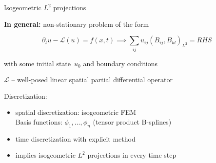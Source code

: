 \documentclass[c]{beamer}
\newcommand{\Prod}[2]{(#1, #2)_{L^2}}
\begin{document}
\begin{frame}{Isogeometric $L^2$ projections}


\textbf{In general:} non-stationary problem of the form

\begin{equation*}
  \partial_t u - \mathcal{L}(u) = f(x, t) \implies  \sum_{ij} u_{ij} \Prod{B_{ij}}{B_{kl}} = RHS
\end{equation*}

with some initial state~$u_0$ and boundary conditions
\vspace{2mm}

$\mathcal{L}$ -- well-posed linear spatial partial differential operator

\vspace{3mm}

Discretization:
\begin{itemize}
  \item spatial discretization: isogeometric FEM
  \\\vspace{2mm}
  Basis functions: $\phi_1,\ldots,\phi_n$ (tensor product B-splines)
  \\\vspace{2mm}
  \item time discretization with explicit method
  \\\vspace{2mm}
  \item implies isogeometric $L^2$ projections in every time step 
  
\end{itemize}

\end{frame}


\end{document}
